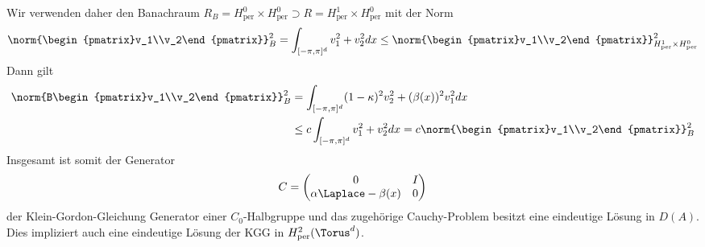 Wir verwenden daher den Banachraum $R_B=H_\text{per}^0\times H_\text{per}^0\supset R=H_\text{per}^1\times H_\text{per}^0$ mit der Norm 
\[\norm{\begin{pmatrix}v_1\\v_2\end{pmatrix}}_B^2=\int_{[-\pi,\pi]^d}v_1^2+v_2^2dx\le 
\norm{\begin{pmatrix}v_1\\v_2\end{pmatrix}}^2_{H_\text{per}^1\times H_\text{per}^0}\]
Dann gilt
\begin{align*}
\norm{B\begin{pmatrix}v_1\\v_2\end{pmatrix}}^2_B&=\int_{[-\pi,\pi]^d}(1-\kappa)^2v_2^2+(\beta(x))^2v_1^2dx\\
&\le c\int_{[-\pi,\pi]^d}v_1^2+v_2^2dx=c\norm{\begin{pmatrix}v_1\\v_2\end{pmatrix}}_B^2
\end{align*}
Insgesamt ist somit der Generator 
\[C=\begin{pmatrix}0 & I\\ \alpha\Laplace - \beta(x) & 0\end{pmatrix}\]
der Klein-Gordon-Gleichung Generator einer $C_0$-Halbgruppe und das zugehörige Cauchy-Problem besitzt eine eindeutige Lösung in $D(A)$. Dies impliziert auch eine eindeutige Lösung der KGG in $H_\text{per}^2(\Torus^d)$.
